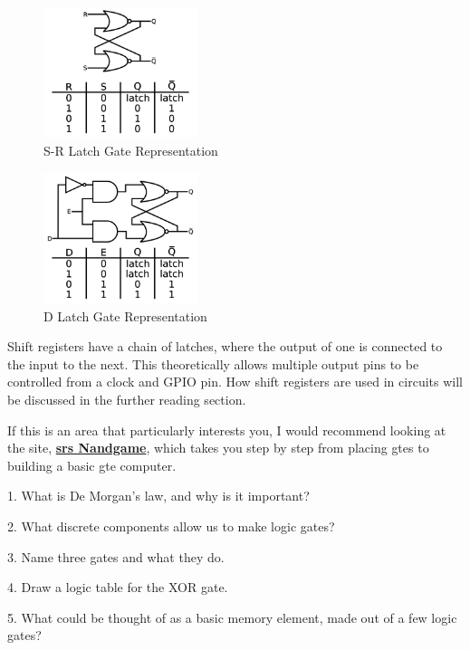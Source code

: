 \documentclass[a4paper,11pt]{report}
\newcommand{\Quiz}[1] %
{
\par\noindent %
\phantomsection %
\todo[inline, color=blue!30]{\textbf{#1}} %
\vspace{1em} %
}
\let\oldhref\href %
\renewcommand{\href}[2]{\oldhref{#1}{\bf\gls{srs} #2}}
\begin{document}
\begin{figure}[H]
\centering
\includegraphics[width=0.4\textwidth]{srlatch}
\caption{S-R Latch Gate Representation}
\end{figure}

\begin{figure}[H]
\centering
\includegraphics[width=0.4\textwidth]{dlatch}
\caption{D Latch Gate Representation}
\end{figure}

Shift registers have a chain of latches, where the output of one is connected to the input to the next. This theoretically allows multiple output pins to be controlled from a clock and GPIO pin. How shift registers are used in circuits will be discussed in the further reading section.

If this is an area that particularly interests you, I would recommend looking at the site, \href{https://nandgame.com/}{Nandgame}, which takes you step by step from placing \gls{gte}s to building a basic \gls{gte} computer.

\Quiz{Quiz}

1. What is De Morgan's law, and why is it important?

2. What discrete components allow us to make logic gates?

3. Name three gates and what they do.

4. Draw a logic table for the XOR gate.

5. What could be thought of as a basic memory element, made out of a few logic gates?

\pagebreak
\end{document}

